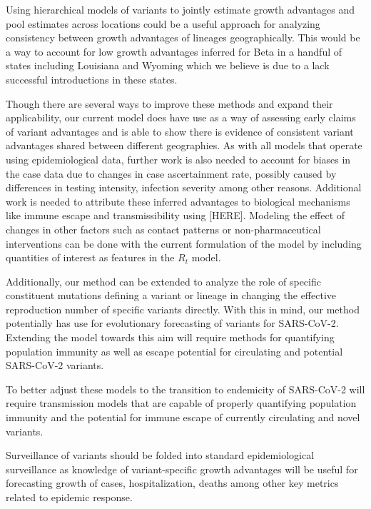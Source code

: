 \documentclass[12pt]{article}
\begin{document}
Using hierarchical models of variants to jointly estimate growth advantages and pool estimates across locations could be a useful approach for analyzing consistency between growth advantages of lineages geographically.
This would be a way to account for low growth advantages inferred for Beta in a handful of states including Louisiana and Wyoming which we believe is due to a lack successful introductions in these states.

Though there are several ways to improve these methods and expand their applicability, our current model does have use as a way of assessing early claims of variant advantages and is able to show there is evidence of consistent variant advantages shared between different geographies.
As with all models that operate using epidemiological data, further work is also needed to account for biases in the case data due to changes in case ascertainment rate, possibly caused by differences in testing intensity, infection severity among other reasons.
Additional work is needed to attribute these inferred advantages to biological mechanisms like immune escape and transmissibility using [HERE].
Modeling the effect of changes in other factors such as contact patterns or non-pharmaceutical interventions can be done with the current formulation of the model by including quantities of interest as features in the $R_{t}$ model.

Additionally, our method can be extended to analyze the role of specific constituent mutations defining a variant or lineage in changing the effective reproduction number of specific variants directly.
With this in mind, our method potentially has use for evolutionary forecasting of variants for SARS-CoV-2.
Extending the model towards this aim will require methods for quantifying population immunity as well as escape potential for circulating and potential SARS-CoV-2 variants.

To better adjust these models to the transition to endemicity of SARS-CoV-2 will require transmission models that are capable of properly quantifying population immunity and the potential for immune escape of currently circulating and novel variants.

Surveillance of variants should be folded into standard epidemiological surveillance as knowledge of variant-specific growth advantages will be useful for forecasting growth of cases, hospitalization, deaths among other key metrics related to epidemic response.
\end{document}

